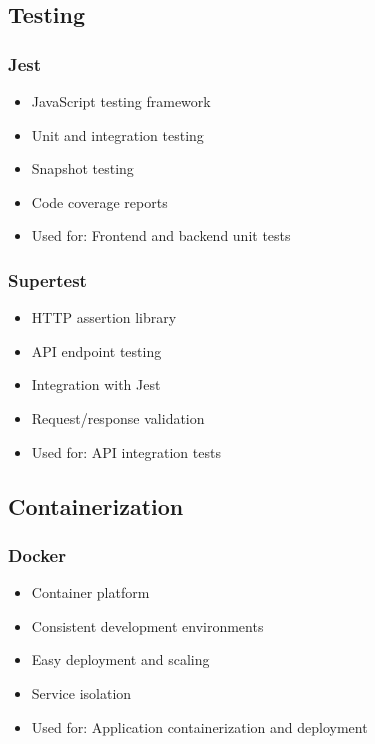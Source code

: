 \subsection{Testing}

\subsubsection{Jest}
\begin{itemize}[leftmargin=*]
    \item JavaScript testing framework
    \item Unit and integration testing
    \item Snapshot testing
    \item Code coverage reports
    \item Used for: Frontend and backend unit tests
\end{itemize}

\subsubsection{Supertest}
\begin{itemize}[leftmargin=*]
    \item HTTP assertion library
    \item API endpoint testing
    \item Integration with Jest
    \item Request/response validation
    \item Used for: API integration tests
\end{itemize}

\subsection{Containerization}

\subsubsection{Docker}
\begin{itemize}[leftmargin=*]
    \item Container platform
    \item Consistent development environments
    \item Easy deployment and scaling
    \item Service isolation
    \item Used for: Application containerization and deployment
\end{itemize}

